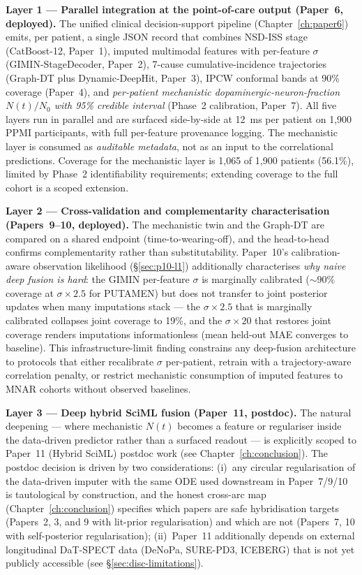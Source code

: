 \textbf{Layer 1 --- Parallel integration at the point-of-care output (Paper~6, deployed).} The unified clinical decision-support pipeline (Chapter~\ref{ch:paper6}) emits, per patient, a single JSON record that combines NSD-ISS stage (CatBoost-12, Paper~1), imputed multimodal features with per-feature $\sigma$ (GIMIN-StageDecoder, Paper~2), 7-cause cumulative-incidence trajectories (Graph-DT plus Dynamic-DeepHit, Paper~3), IPCW conformal bands at 90\% coverage (Paper~4), and \emph{per-patient mechanistic dopaminergic-neuron-fraction $N(t)/N_0$ with 95\% credible interval} (Phase~2 calibration, Paper~7). All five layers run in parallel and are surfaced side-by-side at 12~ms per patient on 1{,}900 PPMI participants, with full per-feature provenance logging. The mechanistic layer is consumed as \emph{auditable metadata}, not as an input to the correlational predictions. Coverage for the mechanistic layer is 1{,}065 of 1{,}900 patients (56.1\%), limited by Phase~2 identifiability requirements; extending coverage to the full cohort is a scoped extension.

\textbf{Layer 2 --- Cross-validation and complementarity characterisation (Papers~9--10, deployed).} The mechanistic twin and the Graph-DT are compared on a shared endpoint (time-to-wearing-off), and the head-to-head confirms complementarity rather than substitutability. Paper~10's calibration-aware observation likelihood (\S\ref{sec:p10-l1}) additionally characterises \emph{why naive deep fusion is hard}: the GIMIN per-feature $\sigma$ is marginally calibrated ($\sim 90\%$ coverage at $\sigma \times 2.5$ for PUTAMEN) but does not transfer to joint posterior updates when many imputations stack --- the $\sigma \times 2.5$ that is marginally calibrated collapses joint coverage to 19\%, and the $\sigma \times 20$ that restores joint coverage renders imputations informationless (mean held-out MAE converges to baseline). This infrastructure-limit finding constrains any deep-fusion architecture to protocols that either recalibrate $\sigma$ per-patient, retrain with a trajectory-aware correlation penalty, or restrict mechanistic consumption of imputed features to MNAR cohorts without observed baselines.

\textbf{Layer 3 --- Deep hybrid SciML fusion (Paper~11, postdoc).} The natural deepening --- where mechanistic $N(t)$ becomes a feature or regulariser inside the data-driven predictor rather than a surfaced readout --- is explicitly scoped to Paper~11 (Hybrid SciML) postdoc work (see Chapter~\ref{ch:conclusion}). The postdoc decision is driven by two considerations: (i)~any circular regularisation of the data-driven imputer with the same ODE used downstream in Paper~7/9/10 is tautological by construction, and the honest cross-arc map (Chapter~\ref{ch:conclusion}) specifies which papers are safe hybridisation targets (Papers~2, 3, and 9 with lit-prior regularisation) and which are not (Papers~7, 10 with self-posterior regularisation); (ii)~Paper~11 additionally depends on external longitudinal DaT-SPECT data (DeNoPa, SURE-PD3, ICEBERG) that is not yet publicly accessible (see \S\ref{sec:disc-limitations}).

